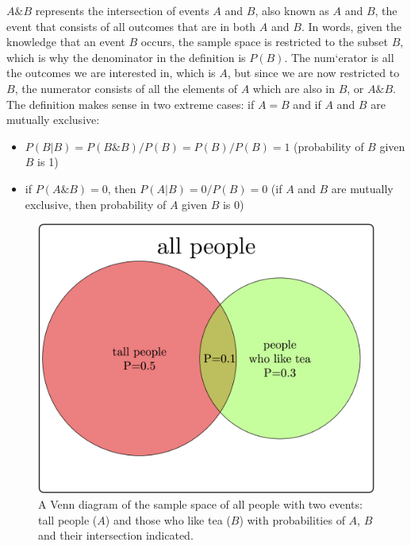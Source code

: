 \documentclass[
  letterpaper,
  DIV=11,
  numbers=noendperiod]{scrreprt}
\providecommand{\tightlist}{%
  \setlength{\itemsep}{0pt}\setlength{\parskip}{0pt}}\usepackage{longtable,booktabs,array}
\begin{document}
\(A \& B\) represents the intersection of events \(A\) and \(B\), also
known as \(A\) and \(B\), the event that consists of all outcomes that
are in both \(A\) and \(B\). In words, given the knowledge that an event
\(B\) occurs, the sample space is restricted to the subset \(B\), which
is why the denominator in the definition is \(P(B)\). The num`erator is
all the outcomes we are interested in, which is \(A\), but since we are
now restricted to \(B\), the numerator consists of all the elements of
\(A\) which are also in \(B\), or \(A \& B\). The definition makes sense
in two extreme cases: if \(A = B\) and if \(A\) and \(B\) are mutually
exclusive:

\begin{itemize}
\tightlist
\item
  \(P(B|B) = P(B \& B) /P(B) = P(B)/P(B) = 1\) (probability of \(B\)
  given \(B\) is 1)
\item
  if \(P(A\& B) =0\), then \(P(A|B) = 0/P(B) = 0\) (if \(A\) and \(B\)
  are mutually exclusive, then probability of \(A\) given \(B\) is 0)
\end{itemize}

\begin{figure}

{\centering \includegraphics{./ch6/cond_prob_tikz.png}

}

\caption{A Venn diagram of the sample space of all people with two
events: tall people (\(A\)) and those who like tea (\(B\)) with
probabilities of \(A\), \(B\) and their intersection indicated.}

\end{figure}
\end{document}
